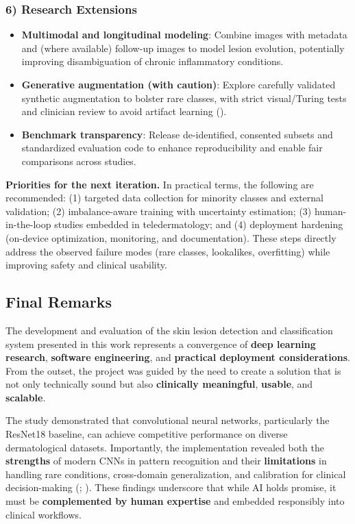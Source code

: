 \documentclass[
  12pt,
  oneside]{article}
\providecommand{\tightlist}{%
  \setlength{\itemsep}{0pt}\setlength{\parskip}{0pt}}
\begin{document}
\subsubsection{6) Research Extensions}\label{research-extensions}

\begin{itemize}
\tightlist
\item
  \textbf{Multimodal and longitudinal modeling}: Combine images with
  metadata and (where available) follow-up images to model lesion
  evolution, potentially improving disambiguation of chronic
  inflammatory conditions.
\item
  \textbf{Generative augmentation (with caution)}: Explore carefully
  validated synthetic augmentation to bolster rare classes, with strict
  visual/Turing tests and clinician review to avoid artifact learning
  ().
\item
  \textbf{Benchmark transparency}: Release de-identified, consented
  subsets and standardized evaluation code to enhance reproducibility
  and enable fair comparisons across studies.
\end{itemize}

\textbf{Priorities for the next iteration.} In practical terms, the
following are recommended: (1) targeted data collection for minority
classes and external validation; (2) imbalance-aware training with
uncertainty estimation; (3) human-in-the-loop studies embedded in
teledermatology; and (4) deployment hardening (on-device optimization,
monitoring, and documentation). These steps directly address the
observed failure modes (rare classes, lookalikes, overfitting) while
improving safety and clinical usability.

\subsection{Final Remarks}\label{final-remarks}

The development and evaluation of the skin lesion detection and
classification system presented in this work represents a convergence of
\textbf{deep learning research}, \textbf{software engineering}, and
\textbf{practical deployment considerations}. From the outset, the
project was guided by the need to create a solution that is not only
technically sound but also \textbf{clinically meaningful},
\textbf{usable}, and \textbf{scalable}.

The study demonstrated that convolutional neural networks, particularly
the ResNet18 baseline, can achieve competitive performance on diverse
dermatological datasets. Importantly, the implementation revealed both
the \textbf{strengths} of modern CNNs in pattern recognition and their
\textbf{limitations} in handling rare conditions, cross-domain
generalization, and calibration for clinical decision-making
(;
). These findings
underscore that while AI holds promise, it must be \textbf{complemented
by human expertise} and embedded responsibly into clinical workflows.
\end{document}
